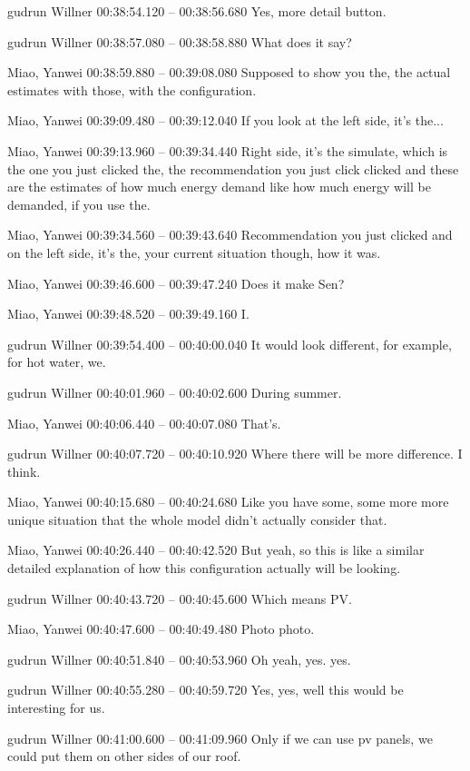 {gudrun Willner 00:38:54.120 -- 00:38:56.680
Yes, more detail button.

gudrun Willner 00:38:57.080 -- 00:38:58.880
What does it say?

Miao, Yanwei 00:38:59.880 -- 00:39:08.080
Supposed to show you the, the actual estimates with those, with the configuration.

Miao, Yanwei 00:39:09.480 -- 00:39:12.040
If you look at the left side, it's the...

Miao, Yanwei 00:39:13.960 -- 00:39:34.440
Right side, it's the simulate, which is the one you just clicked the, the recommendation you just click clicked and these are the estimates of how much energy demand like how much energy will be demanded, if you use the.

Miao, Yanwei 00:39:34.560 -- 00:39:43.640
Recommendation you just clicked and on the left side, it's the, your current situation though, how it was.

Miao, Yanwei 00:39:46.600 -- 00:39:47.240
Does it make Sen?

Miao, Yanwei 00:39:48.520 -- 00:39:49.160
I.

gudrun Willner 00:39:54.400 -- 00:40:00.040
It would look different, for example, for hot water, we.

gudrun Willner 00:40:01.960 -- 00:40:02.600
During summer.

Miao, Yanwei 00:40:06.440 -- 00:40:07.080
That's.

gudrun Willner 00:40:07.720 -- 00:40:10.920
Where there will be more difference. I think.

Miao, Yanwei 00:40:15.680 -- 00:40:24.680
Like you have some, some more more unique situation that the whole model didn't actually consider that.

Miao, Yanwei 00:40:26.440 -- 00:40:42.520
But yeah, so this is like a similar detailed explanation of how this configuration actually will be looking.

gudrun Willner 00:40:43.720 -- 00:40:45.600
Which means PV.

Miao, Yanwei 00:40:47.600 -- 00:40:49.480
Photo photo.

gudrun Willner 00:40:51.840 -- 00:40:53.960
Oh yeah, yes. yes.

gudrun Willner 00:40:55.280 -- 00:40:59.720
Yes, yes, well this would be interesting for us.

gudrun Willner 00:41:00.600 -- 00:41:09.960
Only if we can use pv panels, we could put them on other sides of our roof.

}
